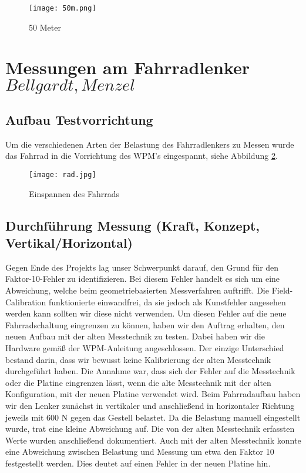\begin{figure}[h]
    \begin{center}
        \texttt{[image: 50m.png]}
        \caption[Reichweitentest 50 Meter]{50 Meter
        }
        \label{fig:50m}
    \end{center}
\end{figure}

\section{Messungen am Fahrradlenker \(Bellgardt, Menzel\)}
\subsection{Aufbau Testvorrichtung}
Um die verschiedenen Arten der Belastung des Fahrradlenkers zu Messen wurde das Fahrrad in die Vorrichtung des WPM's eingespannt, siehe Abbildung \ref{fig:rad}.
\begin{figure}[htbp]
    \begin{center}
        \texttt{[image: rad.jpg]}
        \caption[Einspannen des Fahrrads (Abbildungsverzeichnis)]{Einspannen des Fahrrads}
        
        \label{fig:rad}
    \end{center}
\end{figure}

\subsection{Durchf\"uhrung Messung (Kraft, Konzept, Vertikal/Horizontal)}

Gegen Ende des Projekts lag unser Schwerpunkt darauf, den Grund für den Faktor-10-Fehler zu identifizieren.
Bei diesem Fehler handelt es sich um eine Abweichung, welche beim geometriebasierten Messverfahren auftrifft.
Die Field-Calibration funktionierte einwandfrei, da sie jedoch als Kunstfehler angesehen werden kann sollten wir diese nicht verwenden.
Um diesen Fehler auf die neue Fahrradschaltung eingrenzen zu können, haben wir den Auftrag erhalten, den neuen Aufbau mit der alten Messtechnik zu testen.
Dabei haben wir die Hardware gemäß der WPM-Anleitung angeschlossen. Der einzige Unterschied bestand darin, dass wir bewusst keine Kalibrierung der alten Messtechnik durchgeführt haben.
Die Annahme war, dass sich der Fehler auf die Messtechnik oder die Platine eingrenzen lässt, wenn die alte Messtechnik mit der alten Konfiguration,
mit der neuen Platine verwendet wird.
Beim Fahrradaufbau haben wir den Lenker zunächst in vertikaler und anschließend in horizontaler Richtung jeweils mit 600 N gegen das Gestell belastet.
Da die Belastung manuell eingestellt wurde, trat eine kleine Abweichung auf. Die von der alten Messtechnik erfassten Werte wurden anschließend dokumentiert.
Auch mit der alten Messtechnik konnte eine Abweichung zwischen Belastung und Messung um etwa den Faktor 10 festgestellt werden.
Dies deutet auf einen Fehler in der neuen Platine hin.

